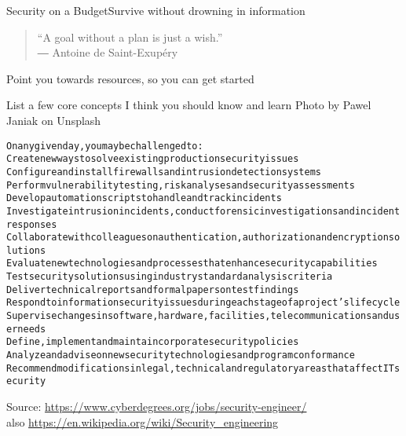 \documentclass[Screen16to9,17pt]{foils}
\begin{document}
{}

\mytitlepage
{Security on a Budget}{Survive without drowning in information}

\hlkprofiluk




\begin{quote}
  “A goal without a plan is just a wish.”\\
  ― Antoine de Saint-Exupéry
\end{quote}




\begin{list1}
\item Point you towards resources, so you can get started
\item List a few core concepts I think you should know and learn
\hskip 2cm {\footnotesize Photo by Pawel Janiak on Unsplash}
\end{list1}



\begin{alltt}\small
On any given day, you may be challenged to:
        Create new ways to solve existing production security issues
        Configure and install firewalls and intrusion detection systems
        Perform vulnerability testing, risk analyses and security assessments
        Develop automation scripts to handle and track incidents
        Investigate intrusion incidents, conduct forensic investigations and incident responses
        Collaborate with colleagues on authentication, authorization and encryption solutions
        Evaluate new technologies and processes that enhance security capabilities
        Test security solutions using industry standard analysis criteria
        Deliver technical reports and formal papers on test findings
        Respond to information security issues during each stage of a project’s lifecycle
        Supervise changes in software, hardware, facilities, telecommunications and user needs
        Define, implement and maintain corporate security policies
        Analyze and advise on new security technologies and program conformance
        Recommend modifications in legal, technical and regulatory areas that affect IT security
\end{alltt}

Source: \url{https://www.cyberdegrees.org/jobs/security-engineer/}\\
also
\url{https://en.wikipedia.org/wiki/Security_engineering}
\end{document}
